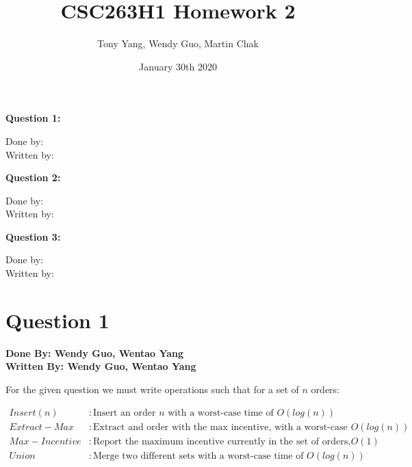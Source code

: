 \documentclass[20pt]{article}
\title{CSC263H1 Homework 2}
\author{Tony Yang, Wendy Guo, Martin Chak}
\date{January 30th 2020}
\begin{document}

\maketitle
\noindent
\textbf{Question 1:}\\
\begin{text}
    Done by:\\
    Written by:\\
\end{text}

\noindent
\textbf{Question 2:}\\
\begin{text}
    Done by:\\
    Written by:\\
\end{text}

\noindent
\textbf{Question 3:}\\
\begin{text}
    Done by:\\
    Written by:\\
\end{text}


\newpage

\section*{Question 1}

\textbf{Done By: Wendy Guo, Wentao Yang}\\
\textbf{Written By: Wendy Guo, Wentao Yang}\\

\begin{text}
    For the given question we must write operations such that for a set of $n$ orders:
\end{text}

\begin{align}
    Insert(n) &: \text{Insert an order $n$ with a worst-case time of $O(log(n))$}\nonumber\\
    Extract-Max &: \text{Extract and order with the max incentive, with a worst-case time of $O(log(n))$}\nonumber\\
    Max-Incentive &: \text{Report the maximum incentive currently in the set of orders, with worst-case time of $O(1)$ }\nonumber\\
    Union &: \text{Merge two different sets with a worst-case time of $O(log(n))$}\nonumber
\end{align}
\end{document}
